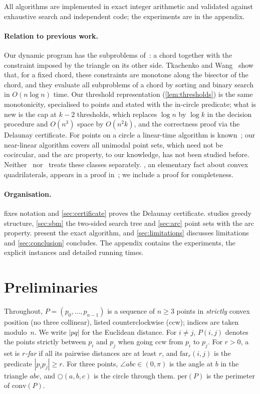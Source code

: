 \documentclass[11pt,a4paper]{article}
\theoremstyle{definition}
\theoremstyle{remark}
\newcommand{\far}{\mathrm{far}}
\newcommand{\per}{\mathrm{per}}
\newcommand{\conv}{\mathrm{conv}}
\newcommand{\ang}{\angle}
\newcommand{\circlethree}[3]{\bigcirc(#1,#2,#3)}
\begin{document}
All algorithms are implemented in exact integer arithmetic and validated
against exhaustive search and independent code; the experiments are in the
appendix.

\paragraph{Relation to previous work.}
Our dynamic program has the subproblems of~\cite{tw25,tw26}: a chord
together with the constraint imposed by the triangle on its other side.
Tkachenko and Wang~\cite[Lemma~12]{tw26} show that, for a fixed chord, these
constraints are monotone along the bisector of the chord, and they evaluate
all subproblems of a chord by sorting and binary search in $O(n\log n)$ time.
Our threshold representation (\cref{lem:thresholds}) is the same monotonicity,
specialised to points and stated with the in-circle predicate; what is new is
the cap at $k-2$ thresholds, which replaces $\log n$ by $\log k$ in the
decision procedure and $O(n^3)$ space by $O(n^2k)$, and the correctness proof
via the Delaunay certificate. For points on a circle a linear-time
algorithm is known~\cite{akagi}; our near-linear algorithm covers all
unimodal point sets, which need not be cocircular, and the arc property, to
our knowledge, has not been studied before. Neither~\cite{tw25,tw26}
nor~\cite{sbm} treats these classes separately. , an
elementary fact about convex quadrilaterals, appears in a proof
in~\cite{diametral}; we include a proof for completeness.

\paragraph{Organisation.}
 fixes notation and \cref{sec:certificate} proves the
Delaunay certificate.  studies greedy structure,
\cref{sec:sbm} the two-sided search tree and \cref{sec:arc} point sets with
the arc property.  present the exact algorithm, and
\cref{sec:limitations} discusses limitations and \cref{sec:conclusion}
concludes. The appendix contains the
experiments, the explicit instances and detailed running times.

\section{Preliminaries}\label{sec:prelim}

Throughout, $P=(p_0,\dots,p_{n-1})$ is a sequence of $n\ge3$ points in
\emph{strictly} convex position (no three collinear), listed counterclockwise
(ccw); indices are taken modulo~$n$. We write $|pq|$ for the Euclidean
distance. For $i\ne j$, $P(i,j)$ denotes the points strictly between $p_i$ and
$p_j$ when going ccw from $p_i$ to $p_j$. For $r>0$, a set is \emph{$r$-far}
if all its pairwise distances are at least $r$, and $\far_r(i,j)$ is the
predicate $|p_ip_j|\ge r$. For three points, $\ang abc\in(0,\pi)$ is the angle
at $b$ in the triangle $abc$, and $\circlethree abc$ is the circle through
them. $\per(P)$ is the perimeter of $\conv(P)$.
\end{document}
